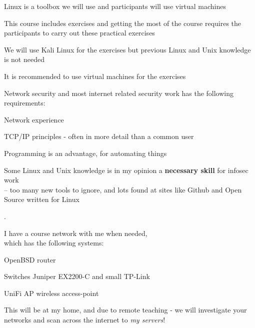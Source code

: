 \documentclass[Screen16to9,17pt]{foils}
\begin{document}
Linux is a toolbox we will use and participants will use virtual machines



\begin{list1}
\item This course includes exercises and getting the most of the course requires the participants to carry out these practical exercises
\item We will use Kali Linux for the exercises but previous Linux and Unix knowledge is not needed
\item It is recommended to use virtual machines for the exercises
\item Network security and most internet related security work has the following requirements:
\begin{list2}
\item Network experience
\item TCP/IP principles - often in more detail than a common user
\item Programming is an advantage, for automating things
\item Some Linux and Unix knowledge is in my opinion a {\bf necessary skill} for infosec work\\
-- too many new tools to ignore, and lots found at sites like Github and Open Source written for Linux
\end{list2}
\end{list1}

.

\begin{list1}
\item I have a course network with me when needed, \\
which has the following systems:
\begin{list2}
\item OpenBSD router
\item Switches Juniper EX2200-C and small TP-Link
\item UniFi AP wireless access-point
\end{list2}
\end{list1}

This will be at my home, and due to remote teaching - we will investigate your networks and scan across the internet to \emph{my servers}!

\end{document}

